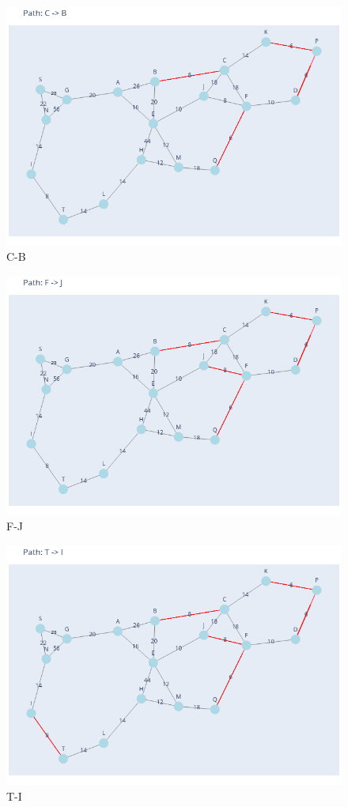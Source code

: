 \documentclass[11pt]{book}
\renewcommand{\=}[1]{\stackrel{#1}{=}} %
\theoremstyle{definition}
\theoremstyle{remark}
\begin{document}
\begin{figure}
    \centering
    \includegraphics[width=1\linewidth]{Trenches/4.png}
    \caption{C-B}
    \label{fig:enter-label}
\end{figure}
\begin{figure}
    \centering
    \includegraphics[width=1\linewidth]{Trenches/5.png}
    \caption{F-J}
    \label{fig:enter-label}
\end{figure}
\begin{figure}
    \centering
    \includegraphics[width=1\linewidth]{Trenches/6.png}
    \caption{T-I}
    \label{fig:enter-label}
\end{figure}
\end{document}
